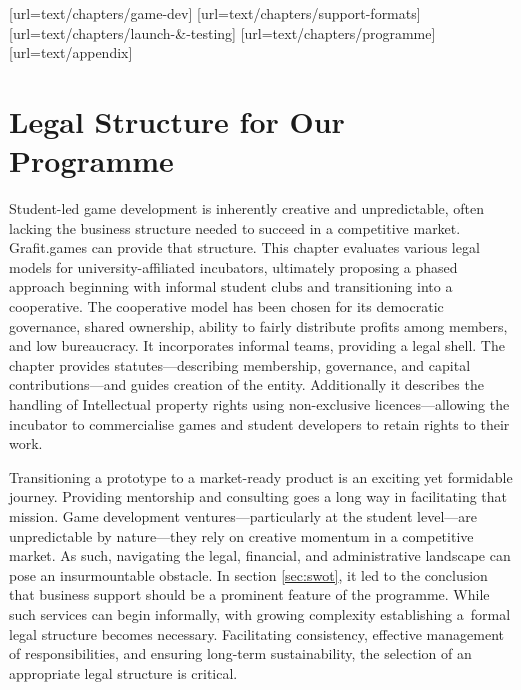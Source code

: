 [url=text/chapters/game-dev]
[url=text/chapters/support-formats]
[url=text/chapters/launch-&-testing]
[url=text/chapters/programme]
[url=text/appendix]
\chapter{Legal Structure for Our Programme}\label{chap:legal}

\begin{chapterabstract}	
    Student-led game development is inherently creative and unpredictable, often lacking the business structure needed to succeed in a competitive market. Grafit.games can provide that structure. This chapter evaluates various legal models for university-affiliated incubators, ultimately proposing a phased approach beginning with informal student clubs and transitioning into a cooperative. The cooperative model has been chosen for its democratic governance, shared ownership, ability to fairly distribute profits among members, and low bureaucracy. It incorporates informal teams, providing a legal shell. The chapter provides statutes—describing membership, governance, and capital contributions---and guides creation of the entity. Additionally it describes the handling of Intellectual property rights using non-exclusive licences---allowing the incubator to commercialise games and student developers to retain rights to their work.
\end{chapterabstract}

Transitioning a prototype to a market-ready product is an exciting yet formidable journey. Providing mentorship and consulting goes a long way in facilitating that mission. Game development ventures—particularly at the student level—are unpredictable by nature---they rely on creative momentum in a competitive market. As such, navigating the legal, financial, and administrative landscape can pose an insurmountable obstacle. In section \ref{sec:swot}, it led to the conclusion that business support should be a prominent feature of the programme. While such services can begin informally, with growing complexity establishing a~formal legal structure becomes necessary. Facilitating consistency, effective management of responsibilities, and ensuring long-term sustainability, the selection of an appropriate legal structure is critical.

